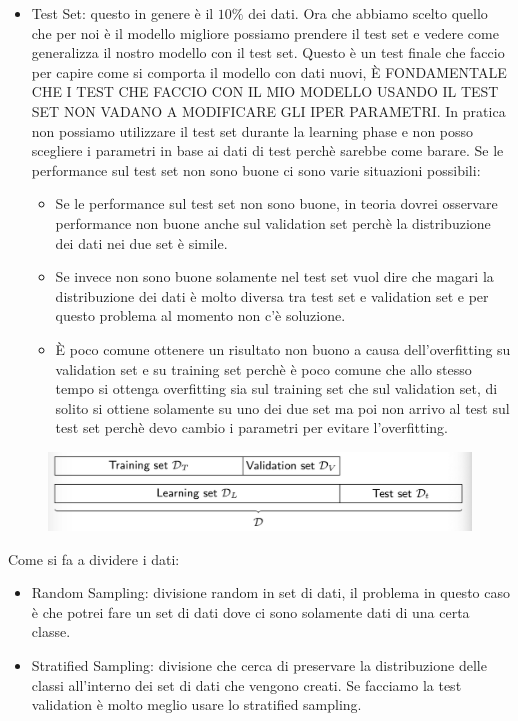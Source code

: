 \documentclass[14pt]{extreport}
\begin{document}
\begin{itemize}
\begin{itemize}
		\end{itemize}
	\item Test Set: questo in genere è il $10\%$ dei dati. Ora che abbiamo scelto quello che per noi è il modello migliore possiamo prendere il test set e vedere come generalizza il nostro modello con il test set. 
	Questo è un test finale che faccio per capire come si comporta il modello con dati nuovi, È FONDAMENTALE CHE I TEST CHE FACCIO CON IL MIO MODELLO USANDO IL TEST SET NON VADANO A MODIFICARE GLI IPER PARAMETRI. In pratica non possiamo utilizzare il test set durante la learning phase e non posso scegliere i parametri in base ai dati di test perchè sarebbe come barare.
	Se le performance sul test set non sono buone ci sono varie situazioni possibili:
	\begin{itemize}
		\item Se le performance sul test set non sono buone, in teoria dovrei osservare performance non buone anche sul validation set perchè la distribuzione dei dati nei due set è simile.
		\item Se invece non sono buone solamente nel test set vuol dire che magari la distribuzione dei dati è molto diversa tra test set e validation set e per questo problema al momento non c’è soluzione.
		\item È poco comune ottenere un risultato non buono a causa dell’overfitting su validation set e su training set perchè è poco comune che allo stesso tempo si ottenga overfitting sia sul training set che sul validation set, di solito si ottiene solamente su uno dei due set ma poi non arrivo al test sul test set perchè devo cambio i parametri per evitare l’overfitting.
		\end{itemize} 
	\end{itemize}


	\begin{figure}[H] 
		\centering
		\includegraphics[width=0.7\linewidth]{455.jpeg}
		\end{figure}

Come si fa a dividere i dati:
\begin{itemize}
	\item Random Sampling: divisione random in set di dati, il problema in questo caso è che potrei fare un set di dati dove ci sono solamente dati di una certa classe.
	\item Stratified Sampling: divisione che cerca di preservare la distribuzione delle classi all’interno dei set di dati che vengono creati.
		Se facciamo la test validation è molto meglio usare lo stratified sampling.
	\end{itemize}
		
\end{document}

